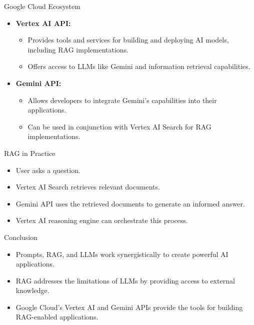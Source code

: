 \documentclass{beamer}
\begin{document}
\begin{frame}{Google Cloud Ecosystem}
    \begin{itemize}
        \item \textbf{Vertex AI API:}
        \begin{itemize}
            \item Provides tools and services for building and deploying AI models, including RAG implementations.
            \item Offers access to LLMs like Gemini and information retrieval capabilities.
        \end{itemize}
        \item \textbf{Gemini API:}
        \begin{itemize}
            \item Allows developers to integrate Gemini's capabilities into their applications.
            \item Can be used in conjunction with Vertex AI Search for RAG implementations.
        \end{itemize}
    \end{itemize}
\end{frame}
%
\begin{frame}{RAG in Practice}
    \begin{itemize}
        \item User asks a question.
        \item Vertex AI Search retrieves relevant documents.
        \item Gemini API uses the retrieved documents to generate an informed answer.
        \item Vertex AI reasoning engine can orchestrate this process.
    \end{itemize}
\end{frame}

\begin{frame}{Conclusion}
  \begin{itemize}
    \item Prompts, RAG, and LLMs work synergistically to create powerful AI applications.
    \item RAG addresses the limitations of LLMs by providing access to external knowledge.
    \item Google Cloud's Vertex AI and Gemini APIs provide the tools for building RAG-enabled applications.
  \end{itemize}
\end{frame}
\end{document}
